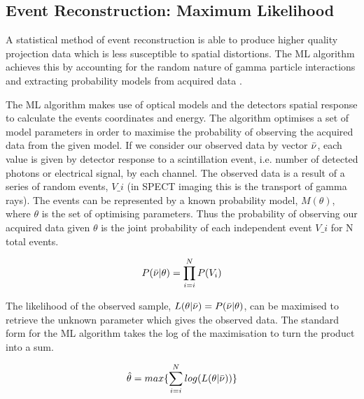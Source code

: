 \subsection{Event Reconstruction: Maximum Likelihood}
A statistical method of event reconstruction is able  to produce higher quality projection data which is less susceptible to spatial distortions. The \acrlong{ML} algorithm achieves this by accounting for the random nature of gamma particle interactions and extracting probability models from acquired data \cite{4307558}.

The \acrshort{ML} algorithm makes use of optical models and the detectors spatial response to calculate the events coordinates and energy. The algorithm optimises a set of model parameters in order to maximise the probability of observing the acquired data from the given model. If we consider our observed data by vector $\Bar{\nu}$, each value is given by detector response to a scintillation event, i.e. number of detected photons or electrical signal, by each channel. The observed data is a result of a series of random events, $V\_i$ (in SPECT imaging this is the transport of gamma rays). The events can be represented by a known probability model, $M(\theta)$, where $\theta$ is the set of optimising parameters. Thus the probability of observing our acquired data given $\theta$ is the joint probability of each independent event $V\_i$ for N total events. 

\begin{equation} \label{eqn:MLProb}
                P(\Bar{\nu}|\theta) = \prod^{N}_{i=i}P(V_i)
\end{equation}

The likelihood of the observed sample, $L(\theta|\Bar{\nu}) = P(\Bar{\nu}|\theta)$, can be maximised to retrieve the unknown parameter which gives the observed data. The standard form for the \acrshort{ML} algorithm takes the log of the maximisation to turn the product into a sum. 

\begin{equation} \label{eqn:ML}
                \hat{\theta} = max\{\sum^{N}_{i=i}log(L(\theta|\Bar{\nu}))\}
\end{equation}


